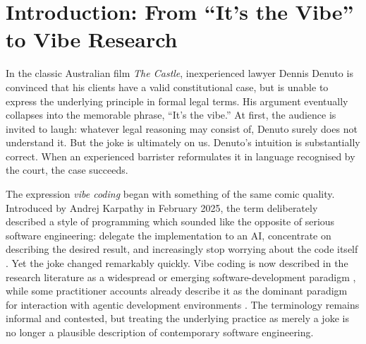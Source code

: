 \documentclass[12pt]{article}
\begin{document}
\begin{abstract}
Our general aims in the paper are not to argue that vibe research is risk-free, nor to propose a general rule for AI authorship. They are rather to identify an apparent asymmetry between software engineering and academic research, examine some of its conceptual, technical, and institutional foundations, and ask whether current academic conventions accurately describe emerging forms of human--AI research collaboration.
\end{abstract}

\clearpage

{}
\tableofcontents
\clearpage

\section{Introduction: From ``It's the Vibe'' to Vibe Research}

In the classic Australian film \emph{The Castle},  inexperienced lawyer Dennis Denuto is convinced that his clients have a valid constitutional case, but is unable to express the underlying principle in formal legal terms. His argument eventually collapses into the memorable phrase, ``It's the vibe.'' At first, the audience is invited to laugh: whatever legal reasoning may consist of, Denuto surely does not understand it. But the joke is ultimately on us. Denuto's intuition is substantially correct. When an experienced barrister reformulates it in language recognised by the court, the case succeeds.

The expression \emph{vibe coding} began with something of the same comic quality. Introduced by Andrej Karpathy in February 2025, the term deliberately described a style of programming which sounded like the opposite of serious software engineering: delegate the implementation to an AI, concentrate on describing the desired result, and increasingly stop worrying about the code itself \citep{fowler2026vibecoding}.
Yet the joke changed remarkably quickly. Vibe coding is now described in the research literature as a widespread or emerging software-development paradigm \citep{meskeEtAl2025vibecoding,sarkarDrosos2025vibecoding}, while some practitioner accounts already describe it as the dominant paradigm for interaction with agentic development environments \citep{nimblabs2026vibecoding}. The terminology remains informal and contested, but treating the underlying practice as merely a joke is no longer a plausible description of contemporary software engineering.
\end{document}

